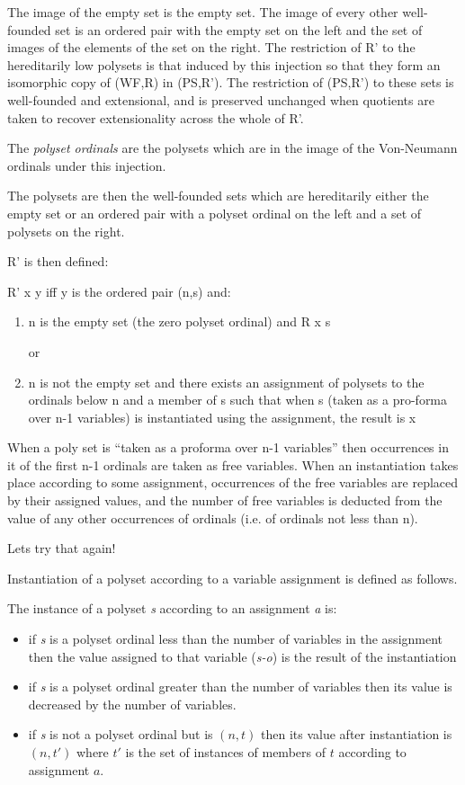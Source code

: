 \documentclass{article}
\begin{document}
\begin{article}
The image of the empty set is the empty set.
The image of every other well-founded set is an ordered pair with the empty set on the left and the set of images of the elements of the set on the right.
The restriction of \textsf{R'} to the hereditarily low polysets is that induced by this injection so that they form an isomorphic copy of \textsf{(WF,R)} in \textsf{(PS,R')}.
The restriction of \textsf{(PS,R')} to these sets is well-founded and extensional, and is preserved unchanged when quotients are taken to recover extensionality across the whole of \textsf{R'}.

The \emph{polyset ordinals} are the polysets which are in the image of the Von-Neumann ordinals under this injection.

The polysets are then the well-founded sets which are hereditarily either the empty set or an ordered pair with a polyset ordinal on the left and a set of polysets on the right.

\textsf{R'} is then defined:

\textsf{R' x y} iff y is the ordered pair \textsf{(n,s)} and:

\begin{enumerate}
\item n is the empty set (the zero polyset ordinal) and \textsf{R x s} 

or
\item n is not the empty set and there exists an assignment of polysets to the ordinals below n and a member of s such that when s (taken as a pro-forma over n-1 variables) is instantiated using the assignment, the result is x 
\end{enumerate}

When a poly set is ``taken as a proforma over n-1 variables'' then occurrences in it of the first n-1 ordinals are taken as free variables.
When an instantiation takes place according to some assignment, occurrences of the free variables are replaced by their assigned values, and the number of free variables is deducted from the value of any other occurrences of ordinals (i.e. of ordinals not less than n).

Lets try that again!

Instantiation of a polyset according to a variable assignment is defined as follows.

The instance of a polyset \emph{s} according to an assignment \emph{a} is:
\begin{itemize}
\item if \emph{s} is a polyset ordinal less than the number of variables in the assignment then the value assigned to that variable (\emph{s-o}) is the result of the instantiation
\item if \emph{s} is a polyset ordinal greater than the number of variables then its value is decreased by the number of variables.
\item if \emph{s} is not a polyset ordinal but is $(n,t)$ then its value after instantiation is $(n,t')$ where $t'$ is the set of instances of members of $t$ according to assignment $a$.
\end{itemize}


\end{article}
\end{document}
